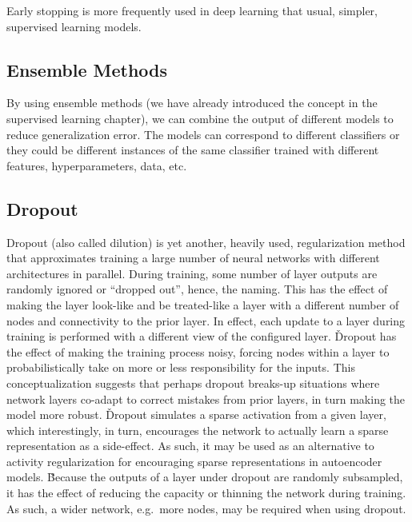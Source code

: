 Early stopping is more frequently used in deep learning that usual, simpler, supervised learning models.

\subsection{Ensemble Methods}

By using ensemble methods (we have already introduced the concept in the supervised learning chapter), we can combine
the output of different models to reduce generalization error. The models can correspond to different classifiers or 
they could be different instances of the same classifier trained with different features, hyperparameters, data, etc.

\subsection{Dropout}

Dropout (also called dilution) is yet another, heavily used, regularization method that approximates training a large
number of neural networks with different architectures in parallel. During training, some number of layer outputs are
randomly ignored or ``dropped out'', hence, the naming. This has the effect of making the layer look-like and be
treated-like a layer with a different number of nodes and connectivity to the prior layer. In effect, each update to 
a layer during training is performed with a different view of the configured layer. \v

Dropout has the effect of making the training process noisy, forcing nodes within a layer to probabilistically take 
on more or less responsibility for the inputs. This conceptualization suggests that perhaps dropout breaks-up 
situations where network layers co-adapt to correct mistakes from prior layers, in turn making the model more robust. \v

Dropout simulates a sparse activation from a given layer, which interestingly, in turn, encourages the network to 
actually learn a sparse representation as a side-effect. As such, it may be used as an alternative to activity 
regularization for encouraging sparse representations in autoencoder models. \v

Because the outputs of a layer under dropout are randomly subsampled, it has the effect of reducing the capacity or 
thinning the network during training. As such, a wider network, e.g.\ more nodes, may be required when using dropout.

